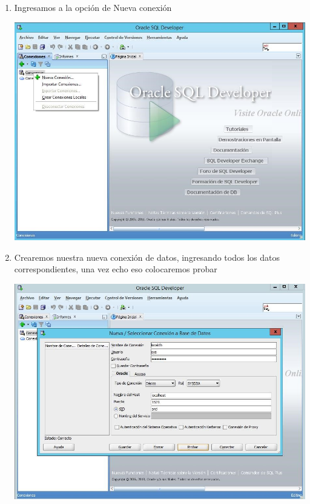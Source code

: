 \begin{enumerate}[1.]
	\item Ingresamos a la opci\'on de Nueva conexi\'on\\
	\begin{center}
	\includegraphics[width=15cm]{./Imagenes/img26} 
	\end{center}

	\item Crearemos nuestra nueva conexi\'on de datos, ingresando todos los datos correspondientes, una vez echo eso colocaremos probar\\
	\begin{center}
	\includegraphics[width=15cm]{./Imagenes/img27} 
	\end{center}


\end{enumerate}
